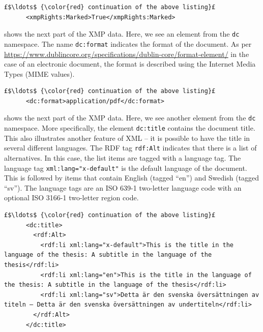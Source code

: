 \documentclass[12pt, twoside]{article}
\begin{document}
\begin{lstlisting}[style=myXML,
caption={{The \texttt{xmpRights:Marked} metadata embedded in a PDF file}}, label={lst:pdfinfoOutputPart4}]
£$\ldots$ {\color{red} continuation of the above listing}£ 
      <xmpRights:Marked>True</xmpRights:Marked>
\end{lstlisting}

 shows the next part of the \gls{XMP} data. Here, we see an element from the \texttt{dc} namespace. The name \texttt{dc:format} indicates the format of the document. As per \url{https://www.dublincore.org/specifications/dublin-core/format-element/} in the case of an electronic document, the format is described using the Internet Media Types (\ie MIME values).
\begin{lstlisting}[style=myXML,
caption={{The \texttt{dc:format} metadata embedded in a PDF file}}, label={lst:pdfinfoOutputPart5}]
£$\ldots$ {\color{red} continuation of the above listing}£ 
      <dc:format>application/pdf</dc:format>
\end{lstlisting}

 shows the next part of the \gls{XMP} data. Here, we see another element from the \texttt{dc} namespace. More specifically, the element \texttt{dc:title} contains the document title. This also illustrates another feature of \gls{XML} -- it is possible to have the title in several different languages. The \gls{RDF} tag \texttt{rdf:Alt} indicates that there is a list of alternatives. In this case, the list items are tagged with a language tag. The language tag \texttt{xml:lang="x-default"} is the default language of the document. This is followed by items that contain English (tagged \enquote{en}) and Swedish (tagged \enquote{sv}). The language tags are an \gls{ISO} 639-1 two-letter language code with an
optional \gls{ISO} 3166-1 two-letter region code.
\begin{lstlisting}[style=myXML,
caption={{The \texttt{dc:title>} metadata embedded in a PDF file (some reformatting has been done to fit the text in the borders)}}, label={lst:pdfinfoOutputPart6}]
£$\ldots$ {\color{red} continuation of the above listing}£ 
      <dc:title>
        <rdf:Alt>
          <rdf:li xml:lang="x-default">This is the title in the language of the thesis: A subtitle in the language of the thesis</rdf:li>
          <rdf:li xml:lang="en">This is the title in the language of the thesis: A subtitle in the language of the thesis</rdf:li>
          <rdf:li xml:lang="sv">Detta är den svenska översättningen av titeln – Detta är den svenska översättningen av undertiteln</rdf:li>
        </rdf:Alt>
      </dc:title>
\end{lstlisting}
\end{document}
